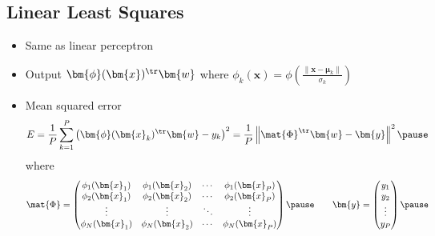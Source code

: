 \begin{slide}
\section[-1.5]{Linear Least Squares}

\begin{PauseHighLight}

\begin{itemize}\squeeze
\item Same as linear perceptron\pause
\item Output $\bm{\phi}(\bm{x})^\tr\bm{w}$ where $\phi_k(\bm{x}) =
  \phi\!\left(\frac{\|\bm{x}-\bm{\mu}_k\|}{\sigma_k}\right)$\pause
\item Mean squared error
  \begin{displaymath}
    E = \frac{1}{P} \sum_{k=1}^P \left( \strut \bm{\phi}(\bm{x}_k)^\tr \bm{w}
    -y_k \right)^2 = \frac{1}{P} \left\| \strut \mat{\Phi}^\tr \bm{w} -
    \bm{y}  \right\|^2\pause
  \end{displaymath}
where
\begin{displaymath}
  \mat{\Phi} = 
  \begin{pmatrix}
    \phi_1(\bm{x}_1) & \phi_1(\bm{x}_2) & \cdots & \phi_1(\bm{x}_P) \\
    \phi_2(\bm{x}_1) & \phi_2(\bm{x}_2) & \cdots & \phi_2(\bm{x}_P) \\
    \vdots & \vdots & \ddots & \vdots \\
    \phi_N(\bm{x}_1) & \phi_N(\bm{x}_2) & \cdots & \phi_N(\bm{x}_P) \\
  \end{pmatrix}\pause \hspace{2em}
  \bm{y} = 
  \begin{pmatrix}
    y_1 \\ y_2 \\ \vdots \\ y_P
  \end{pmatrix}\pause
\end{displaymath}
\end{itemize}

\end{PauseHighLight}
\end{slide}


